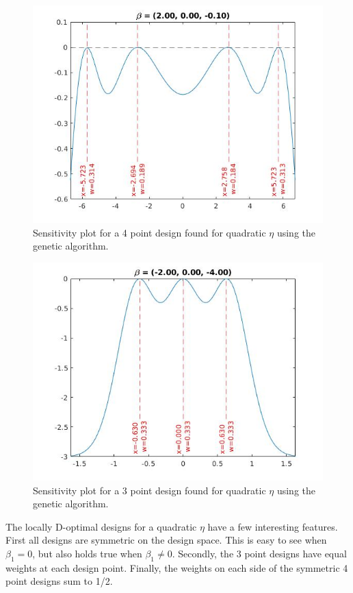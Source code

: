 \documentclass[11pt,a4paper]{article}
\begin{document}
\begin{figure}
\centering
\includegraphics[scale=0.5]{figures/fig3.jpg}
\caption{Sensitivity plot for a 4 point design found for quadratic $\eta$ using the genetic algorithm.}
\end{figure}

\begin{figure}
\centering
\includegraphics[scale=0.5]{figures/fig4.jpg}
\caption{Sensitivity plot for a 3 point design found for quadratic $\eta$ using the genetic algorithm.}
\end{figure}

The locally D-optimal designs for a quadratic $\eta$ have a few interesting features. First all designs are symmetric on the design space. This is easy to see when $\beta_1 = 0$, but also holds true when $\beta_1 \neq 0$. Secondly, the 3 point designs have equal weights at each design point. Finally,  the weights on each side of the symmetric 4 point designs sum to 1/2.
\end{document}
